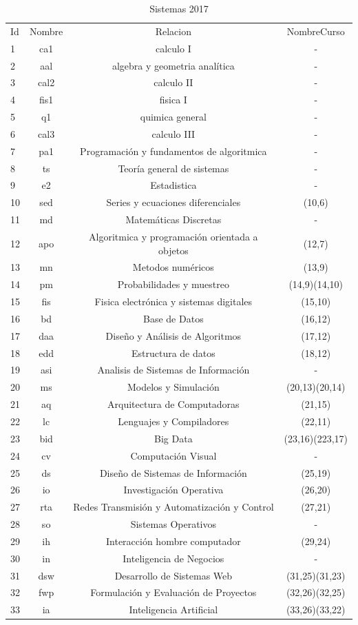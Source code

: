 \newpage

\begin{table}[H]
\centering
\caption{Sistemas 2017}
\begin{tabular}[t]{lccc}
\hline
Id&Nombre&Relacion&NombreCurso\\
1&ca1&calculo I&-\\	
2&aal&algebra y geometria analítica	&-\\
3&cal2&calculo II&-\\	
4&fis1&fisica I&-\\	
5&q1&quimica general&-\\	
6&cal3&calculo III&-\\	
7&pa1&Programación y fundamentos de algoritmica&-\\	
8&ts&Teoría general de sistemas&-\\	
9&e2&Estadistica&-\\	
10&sed&Series y ecuaciones diferenciales				&(10,6)\\
11&md&Matemáticas Discretas	&-\\
12&apo&Algoritmica y programación orientada a objetos	&(12,7)\\
13&mn&Metodos numéricos									&(13,9)\\
14&pm&Probabilidades y muestreo							&(14,9)(14,10)\\
15&fis&Fisica electrónica y sistemas digitales			&(15,10)\\
16&bd&Base de Datos										&(16,12)\\
17&daa&Diseño y Análisis de Algoritmos					&(17,12)\\
18&edd&Estructura de datos								&(18,12)\\
19&asi&Analisis de Sistemas de Información	&-\\
20&ms&Modelos y Simulación								&(20,13)(20,14)\\
21&aq&Arquitectura de Computadoras						&(21,15)\\
22&lc&Lenguajes y Compiladores							&(22,11)\\
23&bid&Big Data											&(23,16)(223,17)\\
24&cv&Computación Visual	&-\\
25&ds&Diseño de Sistemas de Información					&(25,19)\\
26&io&Investigación Operativa							&(26,20)\\
27&rta&Redes Transmisión y Automatización y Control		&(27,21)\\
28&so&Sistemas Operativos	&-\\
29&ih&Interacción hombre computador						&(29,24)\\
30&in&Inteligencia de Negocios	&-\\
31&dsw&Desarrollo de Sistemas Web						&(31,25)(31,23)\\
32&fwp&Formulación y Evaluación de Proyectos			&(32,26)(32,25)\\
33&ia&Inteligencia Artificial							&(33,26)(33,22)\\
\hline
\end{tabular}
\label{tab:tabsis2017}
\end{table}


